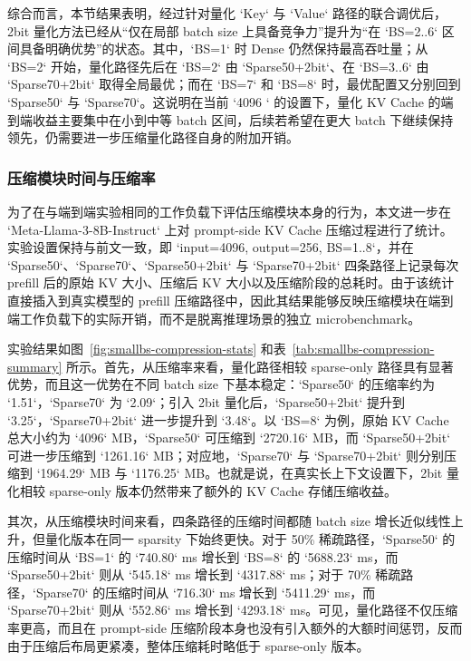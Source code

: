 综合而言，本节结果表明，经过针对量化 `Key` 与 `Value` 路径的联合调优后，2bit 量化方法已经从“仅在局部 batch size 上具备竞争力”提升为“在 `BS=2..6` 区间具备明确优势”的状态。其中，`BS=1` 时 Dense 仍然保持最高吞吐量；从 `BS=2` 开始，量化路径先后在 `BS=2` 由 `Sparse50+2bit`、在 `BS=3..6` 由 `Sparse70+2bit` 取得全局最优；而在 `BS=7` 和 `BS=8` 时，最优配置又分别回到 `Sparse50` 与 `Sparse70`。这说明在当前 `4096 ` 的设置下，量化 KV Cache 的端到端收益主要集中在小到中等 batch 区间，后续若希望在更大 batch 下继续保持领先，仍需要进一步压缩量化路径自身的附加开销。

\subsubsection{压缩模块时间与压缩率}

为了在与端到端实验相同的工作负载下评估压缩模块本身的行为，本文进一步在 `Meta-Llama-3-8B-Instruct` 上对 prompt-side KV Cache 压缩过程进行了统计。实验设置保持与前文一致，即 `input=4096, output=256, BS=1..8`，并在 `Sparse50`、`Sparse70`、`Sparse50+2bit` 与 `Sparse70+2bit` 四条路径上记录每次 prefill 后的原始 KV 大小、压缩后 KV 大小以及压缩阶段的总耗时。由于该统计直接插入到真实模型的 prefill 压缩路径中，因此其结果能够反映压缩模块在端到端工作负载下的实际开销，而不是脱离推理场景的独立 microbenchmark。

实验结果如图~\ref{fig:smallbs-compression-stats} 和表~\ref{tab:smallbs-compression-summary} 所示。首先，从压缩率来看，量化路径相较 sparse-only 路径具有显著优势，而且这一优势在不同 batch size 下基本稳定：`Sparse50` 的压缩率约为 `1.51\times`，`Sparse70` 为 `2.09\times`；引入 2bit 量化后，`Sparse50+2bit` 提升到 `3.25\times`，`Sparse70+2bit` 进一步提升到 `3.48\times`。以 `BS=8` 为例，原始 KV Cache 总大小约为 `4096` MB，`Sparse50` 可压缩到 `2720.16` MB，而 `Sparse50+2bit` 可进一步压缩到 `1261.16` MB；对应地，`Sparse70` 与 `Sparse70+2bit` 则分别压缩到 `1964.29` MB 与 `1176.25` MB。也就是说，在真实长上下文设置下，2bit 量化相较 sparse-only 版本仍然带来了额外的 KV Cache 存储压缩收益。

其次，从压缩模块时间来看，四条路径的压缩时间都随 batch size 增长近似线性上升，但量化版本在同一 sparsity 下始终更快。对于 50\% 稀疏路径，`Sparse50` 的压缩时间从 `BS=1` 的 `740.80` ms 增长到 `BS=8` 的 `5688.23` ms，而 `Sparse50+2bit` 则从 `545.18` ms 增长到 `4317.88` ms；对于 70\% 稀疏路径，`Sparse70` 的压缩时间从 `716.30` ms 增长到 `5411.29` ms，而 `Sparse70+2bit` 则从 `552.86` ms 增长到 `4293.18` ms。可见，量化路径不仅压缩率更高，而且在 prompt-side 压缩阶段本身也没有引入额外的大额时间惩罚，反而由于压缩后布局更紧凑，整体压缩耗时略低于 sparse-only 版本。

